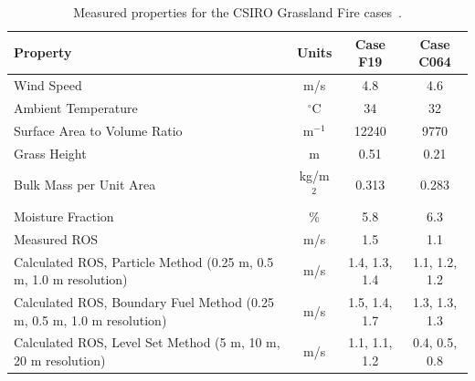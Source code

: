 \documentclass[journal,article,atmosphere,submit,moreauthors,pdftex]{Definitions/mdpi}
\begin{document}
\begin{table}[ht]
\begin{center}
\caption[Measured properties for the CSIRO Grassland Fire cases]{Measured properties for the CSIRO Grassland Fire cases~\cite{Cheney:IJWF1993}.}
\label{Properties_Grasses}
\begin{tabular}{|l|c|c|c|}
\hline
Property                        & Units         & Case F19      & Case C064     \\ \hline \hline
Wind Speed                      & m/s           & 4.8           & 4.6           \\ \hline
Ambient Temperature             & $^\circ$C     & 34            & 32            \\ \hline
Surface Area to Volume Ratio    & m$^{-1}$      & 12240         & 9770          \\ \hline
Grass Height                    & m             & 0.51          & 0.21          \\ \hline
Bulk Mass per Unit Area         & kg/m$^2$      & 0.313         & 0.283         \\ \hline
Moisture Fraction               & \%            & 5.8           & 6.3           \\ \hline
Measured ROS                    & m/s           & 1.5           & 1.1           \\ \hline
Calculated ROS, Particle Method (0.25 m, 0.5 m, 1.0 m resolution) & m/s           & 1.4, 1.3, 1.4           & 1.1, 1.2, 1.2          \\ \hline
Calculated ROS, Boundary Fuel Method (0.25 m, 0.5 m, 1.0 m resolution) & m/s      & 1.5, 1.4, 1.7           & 1.3, 1.3, 1.3           \\ \hline
Calculated ROS, Level Set Method (5 m, 10 m, 20 m resolution) & m/s          & 1.1, 1.1, 1.2          & 0.4, 0.5, 0.8          \\ \hline
\end{tabular}
\end{center}
\end{table}
\end{document}
